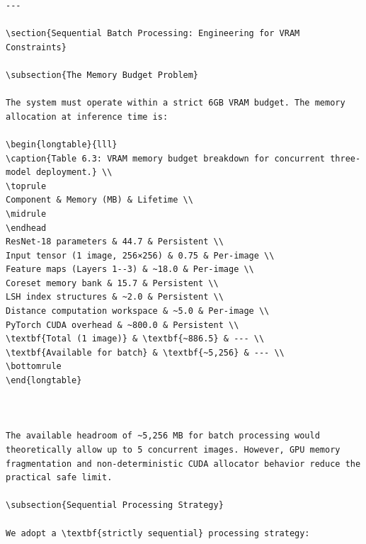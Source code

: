 \documentclass[12pt,a4paper,oneside]{report}
\begin{document}
\begin{verbatim}
---

\section{Sequential Batch Processing: Engineering for VRAM Constraints}

\subsection{The Memory Budget Problem}

The system must operate within a strict 6GB VRAM budget. The memory allocation at inference time is:

\begin{longtable}{lll}
\caption{Table 6.3: VRAM memory budget breakdown for concurrent three-model deployment.} \\
\toprule
Component & Memory (MB) & Lifetime \\
\midrule
\endhead
ResNet-18 parameters & 44.7 & Persistent \\
Input tensor (1 image, 256×256) & 0.75 & Per-image \\
Feature maps (Layers 1--3) & ~18.0 & Per-image \\
Coreset memory bank & 15.7 & Persistent \\
LSH index structures & ~2.0 & Persistent \\
Distance computation workspace & ~5.0 & Per-image \\
PyTorch CUDA overhead & ~800.0 & Persistent \\
\textbf{Total (1 image)} & \textbf{~886.5} & --- \\
\textbf{Available for batch} & \textbf{~5,256} & --- \\
\bottomrule
\end{longtable}



The available headroom of ~5,256 MB for batch processing would theoretically allow up to 5 concurrent images. However, GPU memory fragmentation and non-deterministic CUDA allocator behavior reduce the practical safe limit.

\subsection{Sequential Processing Strategy}

We adopt a \textbf{strictly sequential} processing strategy:

\end{verbatim}
\end{document}
